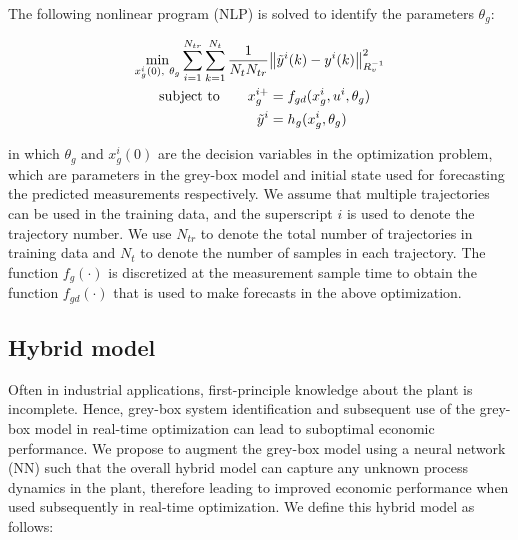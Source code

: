 \documentclass[10pt]{article}
\begin{document}
The following nonlinear program (NLP) is solved to identify the parameters $\theta_g$:

\begin{align} \label{eq:gb_training}
  \underset{x_g^i(0), \ \theta_g}{\textnormal{min}} \sum_{i=1}^{N_{tr}} \sum_{k=1}^{N_t} 
  \dfrac{1}{N_tN_{tr}} &\norm{\tilde{y}^i(k) - y^i(k)}^2_{R_v^{-1}}  \\
  \textnormal{subject to} \quad \quad x_g^{i+} &= f_{gd}(x_g^i, u^i, \theta_g) \nonumber \\
   \tilde{y}^i &= h_g(x_g^i, \theta_g) \nonumber
\end{align}

in which $\theta_g$ and $x_g^i(0)$ are the decision variables in the optimization problem, which are parameters in the grey-box model and initial state used for forecasting the predicted measurements respectively. We assume that multiple trajectories can be used in the training data, and the superscript $i$ is used to denote the trajectory number. We use $N_{tr}$ to denote the total number of trajectories in training data and $N_t$ to denote the number of samples in each trajectory. The function $f_{g}(\cdot)$ is discretized at the measurement sample time to obtain the function $f_{gd}(\cdot)$ that is used to make forecasts in the above optimization.

\subsection{Hybrid model}

Often in industrial applications, first-principle knowledge about the plant is incomplete. Hence, grey-box system identification and subsequent use of the grey-box model in real-time optimization can lead to suboptimal economic performance. We propose to augment the grey-box model using a neural network (NN) such that the overall hybrid model can capture any unknown process dynamics in the plant, therefore leading to improved economic performance when used subsequently in real-time optimization. We define this hybrid model as follows:
\end{document}
